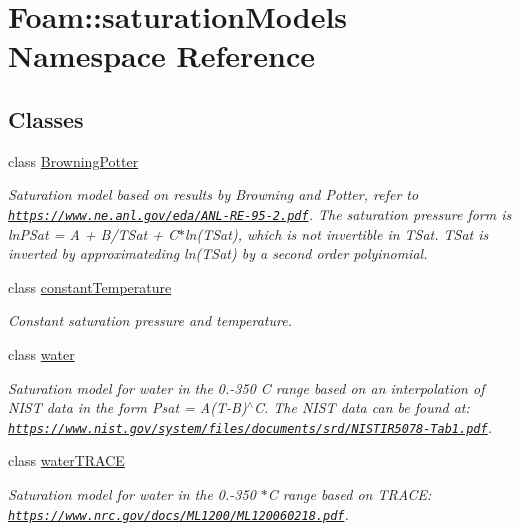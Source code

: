 \hypertarget{namespaceFoam_1_1saturationModels}{}\section{Foam\+:\+:saturation\+Models Namespace Reference}
\label{namespaceFoam_1_1saturationModels}
\subsection*{Classes}
\begin{DoxyCompactItemize}
\item 
class \hyperlink{classFoam_1_1saturationModels_1_1BrowningPotter}{Browning\+Potter}
\begin{DoxyCompactList}\small\item\em Saturation model based on results by Browning and Potter, refer to \href{https://www.ne.anl.gov/eda/ANL-RE-95-2.pdf}{\tt https\+://www.\+ne.\+anl.\+gov/eda/\+A\+N\+L-\/\+R\+E-\/95-\/2.\+pdf}. The saturation pressure form is ln\+P\+Sat = A + B/\+T\+Sat + C$\ast$ln(T\+Sat), which is not invertible in T\+Sat. T\+Sat is inverted by approximateding ln(\+T\+Sat) by a second order polyinomial. \end{DoxyCompactList}\item 
class \hyperlink{classFoam_1_1saturationModels_1_1constantTemperature}{constant\+Temperature}
\begin{DoxyCompactList}\small\item\em Constant saturation pressure and temperature. \end{DoxyCompactList}\item 
class \hyperlink{classFoam_1_1saturationModels_1_1water}{water}
\begin{DoxyCompactList}\small\item\em Saturation model for water in the 0.-\/350 {\itshape C range based on an interpolation of N\+I\+ST data in the form Psat = A}(T-\/B)$^\wedge$C. The N\+I\+ST data can be found at\+: \href{https://www.nist.gov/system/files/documents/srd/NISTIR5078-Tab1.pdf}{\tt https\+://www.\+nist.\+gov/system/files/documents/srd/\+N\+I\+S\+T\+I\+R5078-\/\+Tab1.\+pdf}. \end{DoxyCompactList}\item 
class \hyperlink{classFoam_1_1saturationModels_1_1waterTRACE}{water\+T\+R\+A\+CE}
\begin{DoxyCompactList}\small\item\em Saturation model for water in the 0.-\/350 $\ast$C range based on T\+R\+A\+CE\+: \href{https://www.nrc.gov/docs/ML1200/ML120060218.pdf}{\tt https\+://www.\+nrc.\+gov/docs/\+M\+L1200/\+M\+L120060218.\+pdf}. \end{DoxyCompactList}\end{DoxyCompactItemize}
